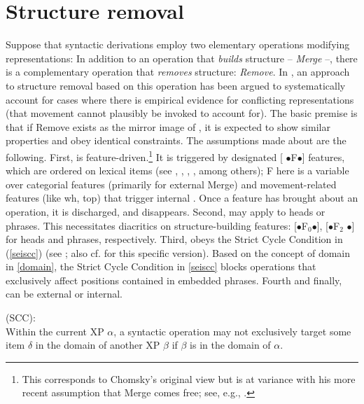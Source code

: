 \documentclass[output=paper]{langsci/langscibook}
\begin{document}
\section{Structure removal}\label{sec:32.3}

Suppose that syntactic derivations employ two elementary operations modifying
representations: In addition to an operation that {\itshape builds} structure --
{\itshape Merge} \parencite{Chomsky2001,Chomsky2008,Chomsky2013} --, there is a
complementary operation that {\itshape removes} structure: {\itshape Remove}. In
\cite{Mueller:16:sho,Mueller:17:fdm,Mueller:17:pre}, an approach to structure
removal based on this operation has been argued to systematically account for
cases where there is empirical evidence for conflicting representations (that
movement cannot plausibly be invoked to account for). The basic premise is that
if Remove exists as the mirror image of , it is expected to show
similar properties and obey identical constraints. The assumptions made about
 are the following. First,  is
feature-driven.\footnote{This corresponds to Chomsky's original view but is at
    variance with his more recent assumption that Merge comes free; see, e.g.,
    \textcite{Chomsky2013}.} It is triggered by designated [{\small
    $\bullet$}F{\small $\bullet$}] features, which are ordered on lexical items
(see \citealt{Heck&Mueller:07:elow}, \citealt{Abels2012}, \citealt{Stabler:14},
\citealt{Georgi:14}, among others); F here is a variable over categorial
features (primarily for external Merge) and movement-related features (like wh,
top) that trigger internal .  Once a feature has brought about an
operation, it is discharged, and disappears.  Second,  may apply to
heads or phrases. This necessitates diacritics on structure-building features:
[{\small $\bullet$}F$_0${\small $\bullet$}], [{\small $\bullet$}F$_2${\small
$\bullet$}] for heads and phrases, respectively.  Third,  obeys the
Strict Cycle Condition in (\ref{seiscc}) (see
\citealt{Chomsky1973,Chomsky:95,Chomsky2001,Chomsky2008}; also cf.
\citealt{Safir:10,Safir:15} for this specific version). Based on the concept of
domain in \eqref{domain}, the Strict Cycle Condition in \eqref{seiscc} blocks
operations that exclusively affect positions contained in embedded phrases.
Fourth and finally,  can be external or internal.

 (SCC):\\ Within \label{scc}the
current XP $\alpha$, a syntactic operation may not exclusively target some
item $\delta$ in the domain of another XP $\beta$ if $\beta$ is in the domain
of $\alpha$.
\z
\end{document}
